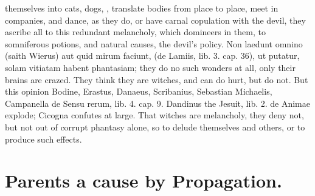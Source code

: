 {{themselves into cats, dogs, \etc{}, translate bodies from place to place,
meet in companies, and dance, as they do, or have carnal copulation
with the devil, they ascribe all to this redundant melancholy, which
domineers in them, to  somniferous potions, and natural causes,
the devil's policy. Non laedunt omnino (saith Wierus) aut quid mirum
faciunt, (de Lamiis, lib. 3. cap. 36), ut putatur, solam vitiatam
habent phantasiam; they do no such wonders at all, only their
brains are crazed. They think they are witches, and can do
hurt, but do not. But this opinion Bodine, Erastus, Danaeus,
Scribanius, Sebastian Michaelis, Campanella de Sensu rerum, lib. 4.
cap. 9. Dandinus the Jesuit, lib. 2. de Animae explode;
Cicogna confutes at large. That witches are melancholy, they deny
not, but not out of corrupt phantasy alone, so to delude themselves and
others, or to produce such effects.

\section{Parents a cause by Propagation.}

}}
